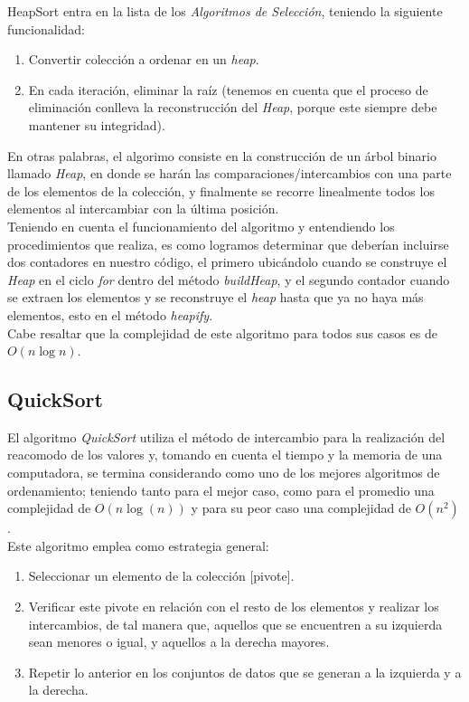 \documentclass[a4paper,12pt]{article}
\begin{document}
HeapSort entra en la lista de los \textit{Algoritmos de Selección}, teniendo la siguiente funcionalidad:

\begin{enumerate}
    \item Convertir colección a ordenar en un \textit{heap}.
    \item En cada iteración, eliminar la raíz (tenemos en cuenta que el proceso de eliminación conlleva la reconstrucción del \textit{Heap}, porque este siempre debe mantener su integridad).
\end{enumerate}

En otras palabras, el algorimo consiste en la construcción de un árbol binario llamado \textit{Heap}, en donde se harán las comparaciones/intercambios con una parte de los elementos de la colección, y finalmente se recorre linealmente todos los elementos al intercambiar con la última posición.\\

Teniendo en cuenta el funcionamiento del algoritmo y entendiendo los procedimientos que realiza, es como logramos determinar que deberían incluirse dos contadores en nuestro código, el primero ubicándolo cuando se construye el \textit{Heap} en el ciclo \textit{for} dentro del método \textit{buildHeap}, y el segundo contador cuando se extraen los elementos y se reconstruye el \textit{heap} hasta que ya no haya más elementos, esto en el método \textit{heapify}.\\  

Cabe resaltar que la complejidad de este algoritmo para todos sus casos es de $O(n \log n)$.

\subsection{QuickSort}

El algoritmo \textit{QuickSort} utiliza el método de intercambio para la realización del reacomodo de los valores y, tomando en cuenta el tiempo y la memoria de una computadora, se termina considerando como uno de los mejores algoritmos de ordenamiento; teniendo tanto para el mejor caso, como para el promedio una complejidad de $O(n \log(n))$ y para su peor caso una complejidad de $O(n^2)$.\\

Este algoritmo emplea como estrategia general:

\begin{enumerate}
    \item Seleccionar un elemento de la colección [pivote].
    \item Verificar este pivote en relación con el resto de los elementos y realizar los intercambios, de tal manera que, aquellos que se encuentren a su izquierda sean menores o igual, y aquellos a la derecha mayores.
    \item Repetir lo anterior en los conjuntos de datos que se generan a la izquierda y a la derecha.
\end{enumerate}
\end{document}
